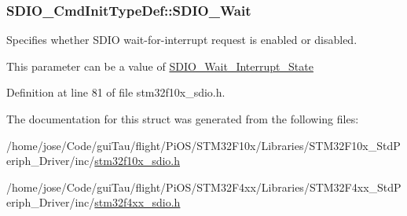 \hypertarget{struct_s_d_i_o___cmd_init_type_def_a582258554233ff8550bd04d2d790c67c}{
\subsubsection[{S\-D\-I\-O\-\_\-\-Wait}]{ S\-D\-I\-O\-\_\-\-Cmd\-Init\-Type\-Def\-::\-S\-D\-I\-O\-\_\-\-Wait}}\label{struct_s_d_i_o___cmd_init_type_def_a582258554233ff8550bd04d2d790c67c}
\begin{DoxyVerb}      Specifies whether SDIO wait-for-interrupt request is enabled or disabled.
\end{DoxyVerb}
 This parameter can be a value of \hyperlink{group___s_d_i_o___wait___interrupt___state}{S\-D\-I\-O\-\_\-\-Wait\-\_\-\-Interrupt\-\_\-\-State} 

Definition at line 81 of file stm32f10x\-\_\-sdio.\-h.



The documentation for this struct was generated from the following files\-:\begin{DoxyCompactItemize}
\item 
/home/jose/\-Code/gui\-Tau/flight/\-Pi\-O\-S/\-S\-T\-M32\-F10x/\-Libraries/\-S\-T\-M32\-F10x\-\_\-\-Std\-Periph\-\_\-\-Driver/inc/\hyperlink{stm32f10x__sdio_8h}{stm32f10x\-\_\-sdio.\-h}\item 
/home/jose/\-Code/gui\-Tau/flight/\-Pi\-O\-S/\-S\-T\-M32\-F4xx/\-Libraries/\-S\-T\-M32\-F4xx\-\_\-\-Std\-Periph\-\_\-\-Driver/inc/\hyperlink{stm32f4xx__sdio_8h}{stm32f4xx\-\_\-sdio.\-h}\end{DoxyCompactItemize}
